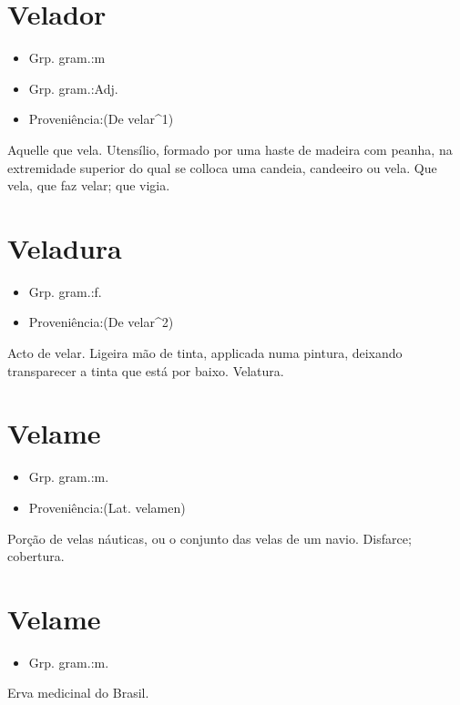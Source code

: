 \documentclass{article}
\begin{document}
\section{Velador}
\begin{itemize}
\item {Grp. gram.:m}
\end{itemize}
\begin{itemize}
\item {Grp. gram.:Adj.}
\end{itemize}
\begin{itemize}
\item {Proveniência:(De \textunderscore velar\textunderscore  ^1)}
\end{itemize}
Aquelle que vela.
Utensílio, formado por uma haste de madeira com peanha, na extremidade superior do qual se colloca uma candeia, candeeiro ou vela.
Que vela, que faz velar; que vigia.
\section{Veladura}
\begin{itemize}
\item {Grp. gram.:f.}
\end{itemize}
\begin{itemize}
\item {Proveniência:(De \textunderscore velar\textunderscore ^2)}
\end{itemize}
Acto de velar.
Ligeira mão de tinta, applicada numa pintura, deixando transparecer a tinta que está por baixo.
Velatura.
\section{Velame}
\begin{itemize}
\item {Grp. gram.:m.}
\end{itemize}
\begin{itemize}
\item {Proveniência:(Lat. \textunderscore velamen\textunderscore )}
\end{itemize}
Porção de velas náuticas, ou o conjunto das velas de um navio.
Disfarce; cobertura.
\section{Velame}
\begin{itemize}
\item {Grp. gram.:m.}
\end{itemize}
Erva medicinal do Brasil.
\end{document}
